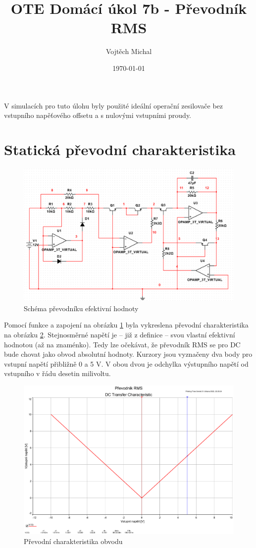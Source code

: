 \documentclass[twoside]{article}
\title{OTE Domácí úkol 7b - Převodník RMS}
\author{Vojtěch Michal}
\date{\today}
\begin{document}
\maketitle

V simulacích pro tuto úlohu byly použité ideální operační zesilovače bez vstupního napěťového offsetu
a s nulovými vstupními proudy.

\section{Statická převodní charakteristika}

\begin{figure}[h!]
    \centering
    \includegraphics[width=0.55\linewidth]{prevod_char_schema.png}
    \caption{Schéma převodníku efektivní hodnoty}
    \label{fig:prevod_char_schema}
\end{figure}

Pomocí funkce  a zapojení na obrázku \ref{fig:prevod_char_schema} byla vykreslena převodní charakteristika na obrázku \ref{fig:prevod_char}.
Stejnosměrné napětí je -- již z definice -- svou vlastní efektivní hodnotou (až na znaménko). Tedy lze očekávat, že převodník RMS se pro DC bude chovat jako obvod absolutní hodnoty.
Kurzory jsou vyznačeny dva body pro vstupní napětí přibližně 0 a 5 V.
V obou dvou je odchylka výstupního napětí od vstupního v řádu desetin milivoltu.


\begin{figure}[h!]
    \centering
    \includegraphics[width=0.55\linewidth]{prevod_char.pdf}
    \caption{Převodní charakteristika obvodu}
    \label{fig:prevod_char}
\end{figure}
\end{document}
